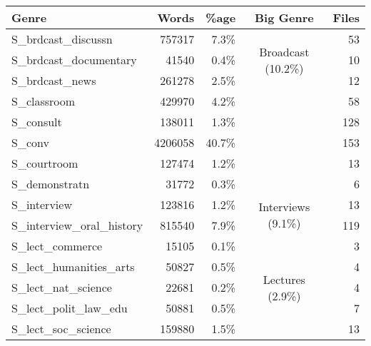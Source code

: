 
\begin{table}[Ht]
    \centering

    \begin{tabular}{lrrcr}
        \hline
        Genre                       & Words    & \%age    & Big Genre                           & Files \\ \hline
        S\_brdcast\_discussn        & 757317   & 7.3\%   & \multirow{3}{*}{Broadcast (10.2\%)} & 53    \\
        S\_brdcast\_documentary     & 41540    & 0.4\%   &                                     & 10    \\
        S\_brdcast\_news            & 261278   & 2.5\%   &                                     & 12    \\ \cline{4-4}
        S\_classroom                & 429970   & 4.2\%   &                                     & 58    \\
        S\_consult                  & 138011   & 1.3\%   &                                     & 128   \\
        S\_conv                     & 4206058  & 40.7\%  &                                     & 153   \\
        S\_courtroom                & 127474   & 1.2\%   &                                     & 13    \\
        S\_demonstratn              & 31772    & 0.3\%   &                                     & 6     \\ \cline{4-4}
        S\_interview                & 123816   & 1.2\%   & \multirow{2}{*}{Interviews (9.1\%)} & 13    \\
        S\_interview\_oral\_history & 815540   & 7.9\%   &                                     & 119   \\ \cline{4-4}
        S\_lect\_commerce           & 15105    & 0.1\%   & \multirow{5}{*}{Lectures (2.9\%)}   & 3     \\
        S\_lect\_humanities\_arts   & 50827    & 0.5\%   &                                     & 4     \\
        S\_lect\_nat\_science       & 22681    & 0.2\%   &                                     & 4     \\
        S\_lect\_polit\_law\_edu    & 50881    & 0.5\%   &                                     & 7     \\
        S\_lect\_soc\_science       & 159880   & 1.5\%   &                                     & 13    \\ \cline{4-4}

\end{tabular}
\end{table}
